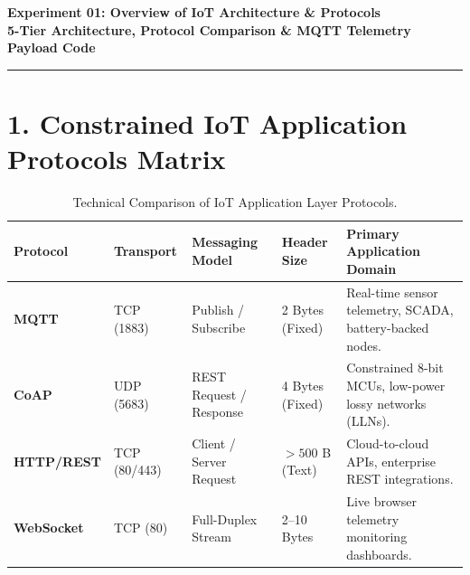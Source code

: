 \documentclass[10pt,a4paper]{article}
\begin{document}
\begin{center}
    {\large\bfseries Experiment 01: Overview of IoT Architecture \& Protocols}\\[0.06cm]
    {\normalsize\textbf{5-Tier Architecture, Protocol Comparison \& MQTT Telemetry Payload Code}}
\end{center}
\vspace{-0.24cm}
\rule{\textwidth}{0.8pt}
\vspace{0.06cm}

\section*{1. Constrained IoT Application Protocols Matrix}
\begin{table}[H]
\centering
\scriptsize
\setlength{\tabcolsep}{4.5pt}
\renewcommand{\arraystretch}{1.20}
\begin{tabularx}{\textwidth}{|p{1.8cm}|p{1.7cm}|p{3.2cm}|p{2.1cm}|X|}
\hline
\textbf{Protocol} & \textbf{Transport} & \textbf{Messaging Model} & \textbf{Header Size} & \textbf{Primary Application Domain} \\
\hline
\textbf{MQTT} & TCP (1883) & Publish / Subscribe & 2 Bytes (Fixed) & Real-time sensor telemetry, SCADA, battery-backed nodes. \\
\textbf{CoAP} & UDP (5683) & REST Request / Response & 4 Bytes (Fixed) & Constrained 8-bit MCUs, low-power lossy networks (LLNs). \\
\textbf{HTTP/REST} & TCP (80/443) & Client / Server Request & $>500$ B (Text) & Cloud-to-cloud APIs, enterprise REST integrations. \\
\textbf{WebSocket} & TCP (80) & Full-Duplex Stream & 2--10 Bytes & Live browser telemetry monitoring dashboards. \\
\hline
\end{tabularx}
\caption{Technical Comparison of IoT Application Layer Protocols.}
\end{table}

\vspace{-0.1cm}
\end{document}
